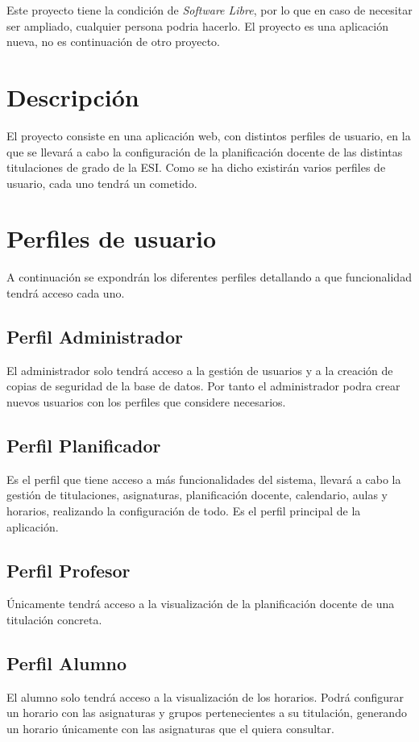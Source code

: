Este proyecto tiene la condición de {\em Software Libre}, por lo que en caso de necesitar ser ampliado, cualquier persona podria hacerlo. El proyecto es una aplicación nueva, no es continuación de otro proyecto.

\section{Descripción}

El proyecto consiste en una aplicación web, con distintos perfiles de usuario, en la que se llevará a cabo la configuración de la planificación docente de las distintas titulaciones de grado de la ESI. Como se ha dicho existirán varios perfiles de usuario, cada uno tendrá un cometido.

\section{Perfiles de usuario}

A continuación se expondrán los diferentes perfiles detallando a que funcionalidad tendrá acceso cada uno.

\subsection{Perfil Administrador}

El administrador solo tendrá acceso a la gestión de usuarios y a la creación de copias de seguridad de la base de datos. Por tanto el administrador podra crear nuevos usuarios con los perfiles que considere necesarios.

\subsection{Perfil Planificador}
Es el perfil que tiene acceso a más funcionalidades del sistema, llevará a cabo la gestión de titulaciones, asignaturas, planificación docente, calendario, aulas y horarios, realizando la configuración de todo. Es el perfil principal de la aplicación.

\subsection{Perfil Profesor}
Únicamente tendrá acceso a la visualización de la planificación docente de una titulación concreta.

\subsection{Perfil Alumno}
El alumno solo tendrá acceso a la visualización de los horarios. Podrá configurar un horario con las asignaturas y grupos pertenecientes a su titulación, generando un horario únicamente con las asignaturas que el quiera consultar.

